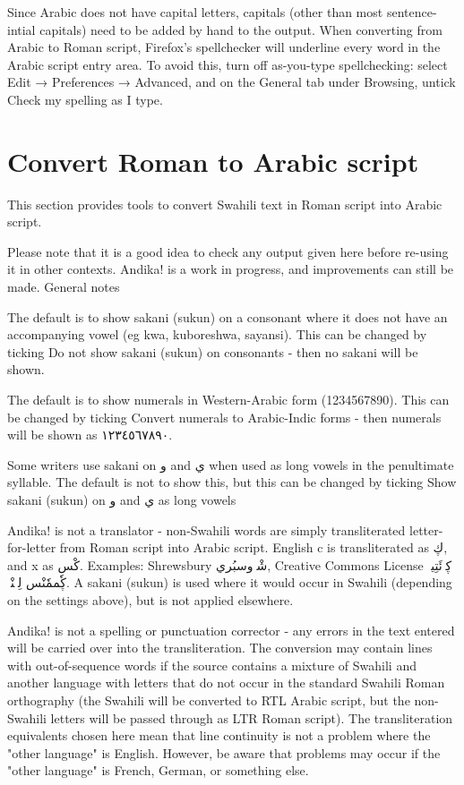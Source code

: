 \documentclass[a4paper,10pt]{article}
\begin{document}
Since Arabic does not have capital letters, capitals (other than most sentence-intial capitals) need to be added by hand to the output.
When converting from Arabic to Roman script, Firefox's spellchecker will underline every word in the Arabic script entry area. To avoid this, turn off as-you-type spellchecking: select Edit → Preferences → Advanced, and on the General tab under Browsing, untick Check my spelling as I type.


\section{Convert Roman to Arabic script}



This section provides tools to convert Swahili text in Roman script into Arabic script.

Please note that it is a good idea to check any output given here before re-using it in other contexts. Andika! is a work in progress, and improvements can still be made.
General notes

The default is to show sakani (sukun) on a consonant where it does not have an accompanying vowel (eg kwa, kuboreshwa, sayansi). This can be changed by ticking Do not show sakani (sukun) on consonants - then no sakani will be shown.

The default is to show numerals in Western-Arabic form (1234567890). This can be changed by ticking Convert numerals to Arabic-Indic forms - then numerals will be shown as ١٢٣٤٥٦٧٨٩٠.

Some writers use sakani on و and ي when used as long vowels in the penultimate syllable. The default is not to show this, but this can be changed by ticking Show sakani (sukun) on و and ي as long vowels

Andika! is not a translator - non-Swahili words are simply transliterated letter-for-letter from Roman script into Arabic script. English c is transliterated as ڮ, and x as كْس. Examples: Shrewsbury شْرٖوسبُري, Creative Commons License ڮرٖئَتِيڤٖ ڮٗممٗنْس لِڮٖنْسٖ. A sakani (sukun) is used where it would occur in Swahili (depending on the settings above), but is not applied elsewhere.

Andika! is not a spelling or punctuation corrector - any errors in the text entered will be carried over into the transliteration.
The conversion may contain lines with out-of-sequence words if the source contains a mixture of Swahili and another language with letters that do not occur in the standard Swahili Roman orthography (the Swahili will be converted to RTL Arabic script, but the non-Swahili letters will be passed through as LTR Roman script). The transliteration equivalents chosen here mean that line continuity is not a problem where the "other language" is English. However, be aware that problems may occur if the "other language" is French, German, or something else.
\end{document}
